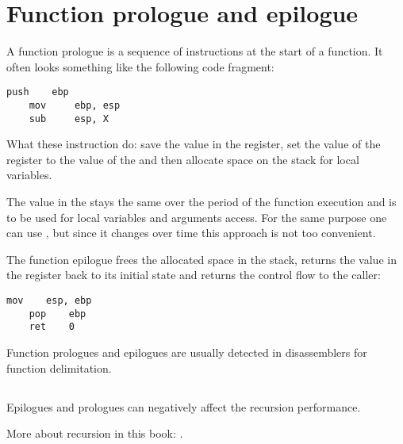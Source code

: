 \section{Function prologue and epilogue}
\label{sec:prologepilog}

A function prologue is a sequence of instructions at the start of a function. It often looks something like the following code fragment:

\begin{lstlisting}[style=customasmx86]
    push    ebp
    mov     ebp, esp
    sub     esp, X
\end{lstlisting}

What these instruction do: save the value in the \EBP register,
set the value of the \EBP register to the value of the \ESP and then allocate space on the stack 
for local variables.

The value in the \EBP stays the same over the period of the function execution and is to be used for local variables and 
arguments access. 
For the same purpose one can use \ESP, but since it changes over time this approach is not too convenient.

The function epilogue frees the allocated space in the stack, returns the value in the \EBP register back to its initial state 
and returns the control flow to the \gls{caller}:

\begin{lstlisting}[style=customasmx86]
    mov    esp, ebp
    pop    ebp
    ret    0
\end{lstlisting}

Function prologues and epilogues are usually detected in disassemblers for function delimitation.

\subsection{\Recursion}

\myindex{\Recursion}
Epilogues and prologues can negatively affect the recursion performance.

More about recursion in this book: .


